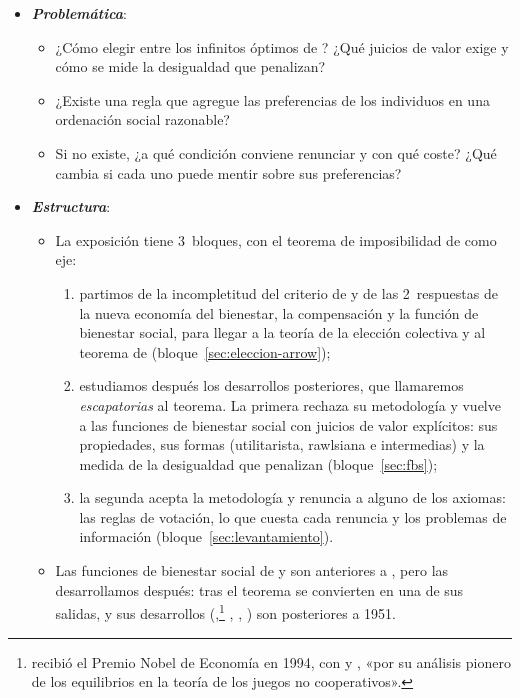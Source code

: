 \documentclass[11pt]{article}
\begin{document}
\begin{itemize}
\item \textbf{\emph{Problemática}}:
  \begin{itemize}
  \item ¿Cómo elegir entre los infinitos óptimos de ? ¿Qué juicios de valor exige y cómo se mide la desigualdad que penalizan?
  \item ¿Existe una regla que agregue las preferencias de los individuos en una ordenación social razonable?
  \item Si no existe, ¿a qué condición conviene renunciar y con qué coste? ¿Qué cambia si cada uno puede mentir sobre sus preferencias?
  \end{itemize}

\item \textbf{\emph{Estructura}}:
  \begin{itemize}
  \item La exposición tiene 3~bloques, con el teorema de imposibilidad de  como eje:
    \begin{enumerate}
    \item partimos de la incompletitud del criterio de  y de las 2~respuestas de la nueva economía del bienestar, la compensación y la función de bienestar social, para llegar a la teoría de la elección colectiva y al teorema de  (bloque~\ref{sec:eleccion-arrow});
    \item estudiamos después los desarrollos posteriores, que llamaremos \emph{escapatorias} al teorema. La primera rechaza su metodología y vuelve a las funciones de bienestar social con juicios de valor explícitos: sus propiedades, sus formas (utilitarista, rawlsiana e intermedias) y la medida de la desigualdad que penalizan (bloque~\ref{sec:fbs});
    \item la segunda acepta la metodología y renuncia a alguno de los axiomas: las reglas de votación, lo que cuesta cada renuncia y los problemas de información (bloque~\ref{sec:levantamiento}).
    \end{enumerate}
  \item Las funciones de bienestar social de \textcite{Bergson1938Reformulation} y \textcite{Samuelson1947Foundations} son anteriores a , pero las desarrollamos después: tras el teorema se convierten en una de sus salidas, y sus desarrollos (,\footnote{ recibió el Premio Nobel de Economía en 1994, con  y , «por su análisis pionero de los equilibrios en la teoría de los juegos no cooperativos»\nocite{Nobel1994Nash}.} , , ) son posteriores a 1951.
  \end{itemize}
\end{itemize}
\end{document}
